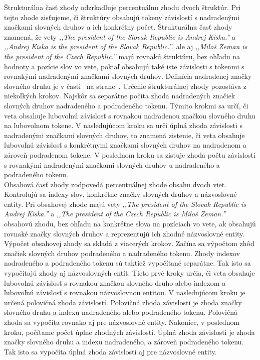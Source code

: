 Štrukturálna časť zhody odzrkadľuje percentuálnu zhodu dvoch štruktúr. Pri tejto zhode zisťujeme, či štruktúry obsahujú tokeny závislostí s nadradenými značkami slovných druhov a ich konkrétny počet. Štrukturálna časť zhody znamená, že vety \textit{,,The president of the Slovak Republic is Andrej Kiska.''} a \textit{,,Andrej Kiska is the president of the Slovak Republic.''}, ale aj \textit{,,Miloš Zeman is the president of the Czech Republic.''} majú rovnakú štruktúru, bez ohľadu na hodnoty a pozície slov vo vete, pokiaľ obsahujú také iste závislosti s tokenmi s rovnakými nadradenými značkami slovných druhov. Definícia nadradenej značky slovného druhu je v časti~ na strane~\pageref{paragraph:superior_pos_tag}. Určenie štrukturálnej zhody pozostáva z niekoľkých krokov. Najskôr sa separátne počíta zhoda nadradených značiek slovných druhov nadradeného a podradeného tokenu. Týmito krokmi sa určí, či veta obsahuje ľubovolnú závislosť s rovnakou nadradenou značkou slovného druhu na ľubovolnom tokene. V nasledujúcom kroku sa určí úplná zhoda závislosti s nadradenými značkami slovných druhov, to znamená zistenie, či veta obsahuje ľubovoľnú závislosť s konkrétnymi značkami slovných druhov na nadradenom a zároveň podradenom tokene. V poslednom kroku sa zisťuje zhoda počtu závislostí s rovnakými nadradenými značkami slovných druhov u nadradeného a podradeného tokenu. \\

Obsahová časť zhody zodpovedá percentuálnej zhode obsahu dvoch viet. Kontrolujú sa indexy slov, konkrétne značky slovných druhov a názvoslovné entity. Pri obsahovej zhode majú vety \textit{,,The president of the Slovak Republic is Andrej Kiska.''} a \textit{,,The president of the Czech Republic is Miloš Zeman.''} obsahovú zhodu, bez ohľadu na konkrétne slova na pozíciach vo vete, ak obsahujú rovnaké značky slovných druhov a reprezentujú ich zhodné názvoslovné entity. Výpočet obsahovej zhody sa skladá z viacerých krokov. Začína sa výpočtom zhôd značiek slovných druhov podradeného a nadradeného tokenu. Zhody indexov nadradeného a podradeného tokenu sú taktiež vypočítané separátne. Tak isto sa vypočítajú zhody aj názvoslovných entít. Tieto prvé kroky určia, či veta obsahuje ľubovolnú závislosť s rovnakou značkou slovného druho alebo indexom a ľubovoľnú závislosť s rovnakou názvoslovnou entitou. V nasledujúcom kroku je určená polovičná zhoda závislostí. Polovičná zhoda závislosti je zhoda značky slovného druhu a indexu nadradeného alebo podradeného tokenu. Polovičná zhoda sa vypočíta rovnako aj pre názvoslovné entity. Nakoniec, v poslednom kroku, počítame počet úplne zhodných závislostí. Úplná zhoda závislosti je zhoda značky slovného druhu a indexu nadradeného, a zároveň podradeného tokenu. Tak isto sa vypočíta úplná zhoda závislostí aj pre názvoslovné entity. \\

